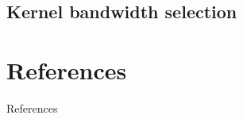 \documentclass[t]{beamer}  %
\begin{document}

\subsection{Kernel bandwidth selection} %
\label{sub:kernel_bandwidth_selection}



\section{References} %
\label{sec:references}

\begin{frame}[t]{References}
  \printbibliography
\end{frame}

\end{document}
